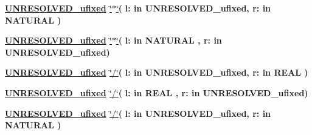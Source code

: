 \begin{DoxyCompactItemize}
\item 
{\bfseries {\bfseries {\bfseries \hyperlink{classfixed__pkg_ae78bc2b36d22f6abeac163955e8a587d}{U\+N\+R\+E\+S\+O\+L\+V\+E\+D\+\_\+ufixed}} \textcolor{vhdlchar}{ }}} \hyperlink{classfixed__pkg_a72ee02603ebb0ddcc88451a45e24e9e0}{\char`\"{}$\ast$\char`\"{}}{\bfseries  ( }{\bfseries \textcolor{vhdlchar}{l\+: }\textcolor{stringliteral}{in }\textcolor{vhdlchar}{U\+N\+R\+E\+S\+O\+L\+V\+E\+D\+\_\+ufixed}}{\bfseries  , \textcolor{vhdlchar}{r\+: }\textcolor{stringliteral}{in }{\bfseries \textcolor{comment}{N\+A\+T\+U\+R\+A\+L}\textcolor{vhdlchar}{ }}}{\bfseries  )} 
\item 
{\bfseries {\bfseries {\bfseries \hyperlink{classfixed__pkg_ae78bc2b36d22f6abeac163955e8a587d}{U\+N\+R\+E\+S\+O\+L\+V\+E\+D\+\_\+ufixed}} \textcolor{vhdlchar}{ }}} \hyperlink{classfixed__pkg_a72ee02603ebb0ddcc88451a45e24e9e0}{\char`\"{}$\ast$\char`\"{}}{\bfseries  ( }{\bfseries \textcolor{vhdlchar}{l\+: }\textcolor{stringliteral}{in }{\bfseries \textcolor{comment}{N\+A\+T\+U\+R\+A\+L}\textcolor{vhdlchar}{ }}}{\bfseries  , \textcolor{vhdlchar}{r\+: }\textcolor{stringliteral}{in }\textcolor{vhdlchar}{U\+N\+R\+E\+S\+O\+L\+V\+E\+D\+\_\+ufixed}}{\bfseries  )} 
\item 
{\bfseries {\bfseries {\bfseries \hyperlink{classfixed__pkg_ae78bc2b36d22f6abeac163955e8a587d}{U\+N\+R\+E\+S\+O\+L\+V\+E\+D\+\_\+ufixed}} \textcolor{vhdlchar}{ }}} \hyperlink{classfixed__pkg_ab2a8e4ea631432a5f115c76c3e709388}{\char`\"{}/\char`\"{}}{\bfseries  ( }{\bfseries \textcolor{vhdlchar}{l\+: }\textcolor{stringliteral}{in }\textcolor{vhdlchar}{U\+N\+R\+E\+S\+O\+L\+V\+E\+D\+\_\+ufixed}}{\bfseries  , \textcolor{vhdlchar}{r\+: }\textcolor{stringliteral}{in }{\bfseries \textcolor{comment}{R\+E\+A\+L}\textcolor{vhdlchar}{ }}}{\bfseries  )} 
\item 
{\bfseries {\bfseries {\bfseries \hyperlink{classfixed__pkg_ae78bc2b36d22f6abeac163955e8a587d}{U\+N\+R\+E\+S\+O\+L\+V\+E\+D\+\_\+ufixed}} \textcolor{vhdlchar}{ }}} \hyperlink{classfixed__pkg_ab2a8e4ea631432a5f115c76c3e709388}{\char`\"{}/\char`\"{}}{\bfseries  ( }{\bfseries \textcolor{vhdlchar}{l\+: }\textcolor{stringliteral}{in }{\bfseries \textcolor{comment}{R\+E\+A\+L}\textcolor{vhdlchar}{ }}}{\bfseries  , \textcolor{vhdlchar}{r\+: }\textcolor{stringliteral}{in }\textcolor{vhdlchar}{U\+N\+R\+E\+S\+O\+L\+V\+E\+D\+\_\+ufixed}}{\bfseries  )} 
\item 
{\bfseries {\bfseries {\bfseries \hyperlink{classfixed__pkg_ae78bc2b36d22f6abeac163955e8a587d}{U\+N\+R\+E\+S\+O\+L\+V\+E\+D\+\_\+ufixed}} \textcolor{vhdlchar}{ }}} \hyperlink{classfixed__pkg_ab2a8e4ea631432a5f115c76c3e709388}{\char`\"{}/\char`\"{}}{\bfseries  ( }{\bfseries \textcolor{vhdlchar}{l\+: }\textcolor{stringliteral}{in }\textcolor{vhdlchar}{U\+N\+R\+E\+S\+O\+L\+V\+E\+D\+\_\+ufixed}}{\bfseries  , \textcolor{vhdlchar}{r\+: }\textcolor{stringliteral}{in }{\bfseries \textcolor{comment}{N\+A\+T\+U\+R\+A\+L}\textcolor{vhdlchar}{ }}}{\bfseries  )} 

\end{DoxyCompactItemize}
